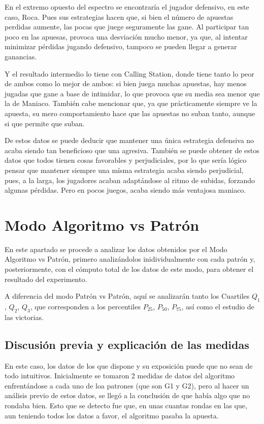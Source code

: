 En el extremo opuesto del espectro se encontraría el jugador defensivo, en este caso, Roca. Pues sus estrategias hacen que, si bien el número de apuestas perdidas aumente, las pocas que  juege seguramente las gane. Al participar tan poco en las apuesas, provoca una desviación mucho menor, ya que, al intentar minimizar pérdidas jugando defensivo, tampoco se pueden llegar a generar ganancias. 

Y el resultado intermedio lo tiene con Calling Station, donde tiene tanto lo peor de ambos como lo mejor de ambos: si bien juega muchas apuestas, hay menos jugadas que gane a base de intimidar, lo que provoca que su media sea menor que la de Maniaco. También cabe mencionar que, ya que prácticamente siempre ve la  apuesta, su mero comportamiento hace que las apuestas no suban tanto, aunque si que permite que suban.

De estos datos se puede deducir que mantener una única estrategia defensiva no acaba siendo tan beneficioso que una agresiva. También se puede obtener de estos datos que todos tienen cosas favorables y perjudiciales, por lo que sería lógico pensar que mantener siempre una mísma estrategia acaba siendo perjudicial, pues, a la larga, los jugadores acaban adaptándose al ritmo de subidas, forzando algunas pérdidas. Pero en pocos juegos, acaba siendo más ventajosa maniaco.

\section{Modo Algoritmo vs Patrón}


En este apartado se procede a analizar los datos obtenidos por el Modo Algoritmo vs Patrón, primero analizándolos inidividualmente con cada patrón y, posteriormente, con el cómputo total de los datos de este modo, para obtener el resultado del experimento.

A diferencia del modo Patrón vs Patrón, aquí se analizarán tanto los Cuartiles $Q_1$, $Q_2$, $Q_3$, que corresponden a los percentiles $P_{25}$, $P_{50}$, $P_{75}$, así como el estudio de las victorias.

\subsection{Discusión previa y explicación de las medidas}
\label{sec:predisc}

En este caso, los datos de los que dispone y su exposición puede que no sean de todo intuitivos. Inicialmente se tomaron 2 medidas de datos del algoritmo enfrentándose a cada uno de loa patrones (que son G1 y G2), pero al hacer un análisis previo de estos datos, se llegó a la conclusión de que había algo que no rondaba bien. Esto que se detecto fue que, en unas cuantas rondas en las que, aun teniendo todos los datos a favor, el algoritmo pasaba la apuesta.


